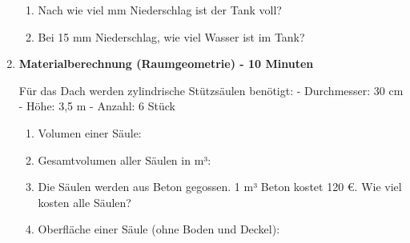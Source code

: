 \begin{enumerate}[label=\arabic*.,resume]
\begin{enumerate}[label=\alph*)]
        \item Nach wie viel mm Niederschlag ist der Tank voll?

        \vspace{2cm}

        \item Bei 15 mm Niederschlag, wie viel Wasser ist im Tank?

        \vspace{1.5cm}

    \end{enumerate}

    \item \textbf{Materialberechnung (Raumgeometrie) - 10 Minuten}

    Für das Dach werden zylindrische Stützsäulen benötigt:
    - Durchmesser: 30 cm  
    - Höhe: 3,5 m
    - Anzahl: 6 Stück

    \begin{enumerate}[label=\alph*)]
        \item Volumen einer Säule:

        \vspace{2cm}

        \item Gesamtvolumen aller Säulen in m³:

        \vspace{1.5cm}

        \item Die Säulen werden aus Beton gegossen. 1 m³ Beton kostet 120 €. Wie viel kosten alle Säulen?

        \vspace{2cm}

        \item Oberfläche einer Säule (ohne Boden und Deckel):

        \vspace{2cm}

    \end{enumerate}

\end{enumerate}